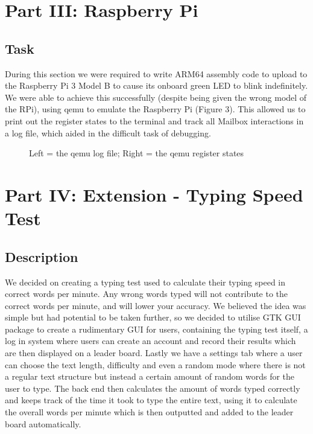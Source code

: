\documentclass{article}
\begin{document}
\section{Part III: Raspberry Pi}

\subsection{Task}

During this section we were required to write ARM64 assembly code to upload to the Raspberry Pi 3 Model B to cause its onboard green LED to blink indefinitely. We were able to achieve this successfully (despite being given the wrong model of the RPi), using qemu to emulate the Raspberry Pi (Figure 3). This allowed us to print out the register states to the terminal and track all Mailbox interactions in a log file, which aided in the difficult task of debugging.

\begin{figure}
\begin{minipage}{.4\textwidth}
\end{minipage}
\hfill    
\begin{minipage}{.4\textwidth}
\end{minipage}
    \caption{Left = the qemu log file; Right = the qemu register states}
\end{figure}


\section{Part IV: Extension - Typing Speed Test}

\subsection{Description}

We decided on creating a typing test used to calculate their typing speed in correct words per minute. Any wrong words typed will not contribute to the correct words per minute, and will lower your accuracy.
We believed the idea was simple but had potential to be taken further, so we decided to utilise GTK GUI package to create a rudimentary GUI for users, containing the typing test itself, a log in system where users can create an account and record their results which are then displayed on a leader board.
Lastly we have a settings tab where a user can choose the text length, difficulty and even a random mode where there is not a regular text structure but instead a certain amount of random words for the user to type. The back end then calculates the amount of words typed correctly and keeps track of the time it took to type the entire text, using it to calculate the overall words per minute which is then outputted and added to the leader board automatically.
\end{document}
